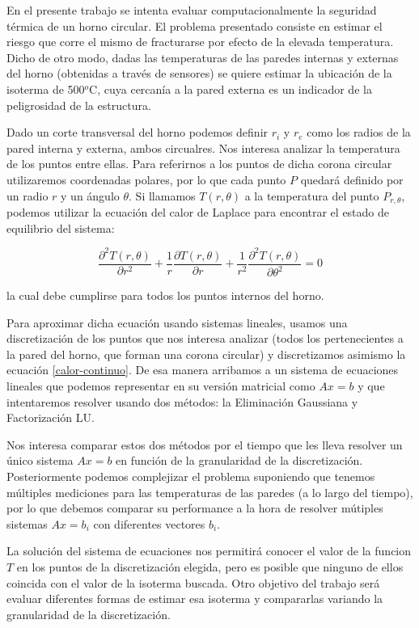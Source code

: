 En el presente trabajo se intenta evaluar computacionalmente la seguridad térmica de un horno circular. El problema presentado consiste en estimar el riesgo que corre el mismo de fracturarse por efecto de la elevada temperatura. Dicho de otro modo, dadas las temperaturas de las paredes internas y externas del horno (obtenidas a través de sensores) se quiere estimar la ubicación de la isoterma de 500$^{o}$C, cuya cercanía a la pared externa es un indicador de la peligrosidad de la estructura.

Dado un corte transversal del horno podemos definir $r_i$ y $r_e$ como los radios de la pared interna y externa, ambos circualres. Nos interesa analizar la temperatura de los puntos entre ellas. Para referirnos a los puntos de dicha corona circular utilizaremos coordenadas polares, por lo que cada punto $P$ quedará definido por un radio $r$ y un ángulo $\theta$. Si llamamos $T(r,\theta)$ a la temperatura del punto $P_{r, \theta}$, podemos utilizar la ecuación del calor de Laplace para encontrar el estado de equilibrio del sistema:

\begin{equation}\label{calor-continuo}
\frac{\partial^2T(r,\theta)}{\partial r^2}+\frac{1}{r}\frac{\partial T(r,\theta)}{\partial r}+\frac{1}{r^2}\frac{\partial^2T(r,\theta)}{\partial \theta^2} = 0 
\end{equation}

la cual debe cumplirse para todos los puntos internos del horno.

Para aproximar dicha ecuación usando sistemas lineales, usamos una discretización de los puntos que nos interesa analizar (todos los pertenecientes a la pared del horno, que forman una corona circular) y discretizamos asimismo la ecuación \ref{calor-continuo}. De esa manera arribamos a un sistema de ecuaciones lineales que podemos representar en su versión matricial como $Ax=b$ y que intentaremos resolver usando dos métodos: la Eliminación Gaussiana y Factorización LU.

Nos interesa comparar estos dos métodos por el tiempo que les lleva resolver un único sistema $Ax=b$ en función de la granularidad de la discretización. Posteriormente podemos complejizar el problema suponiendo que tenemos múltiples mediciones para las temperaturas de las paredes (a lo largo del tiempo), por lo que debemos comparar su performance a la hora de resolver mútiples sistemas $Ax=b_i$ con diferentes vectores $b_i$.

La solución del sistema de ecuaciones nos permitirá conocer el valor de la funcion $T$ en los puntos de la discretización elegida, pero es posible que ninguno de ellos coincida con el valor de la isoterma buscada. Otro objetivo del trabajo será evaluar diferentes formas de estimar esa isoterma y compararlas variando la granularidad de la discretización.

